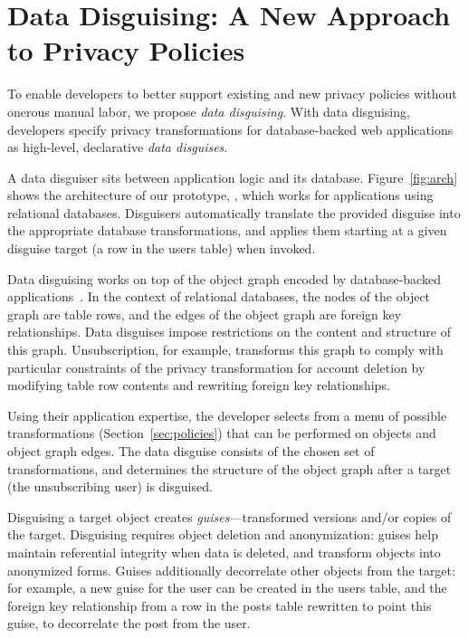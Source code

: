 \section{Data Disguising: A New Approach to Privacy Policies}
%

To enable developers to better support existing and new privacy policies without onerous manual
labor, we propose \emph{data disguising}.
%
With data disguising, developers specify privacy transformations for database-backed web
applications as high-level, declarative \emph{data disguises}.

A data disguiser sits between application logic and its database. Figure~\ref{fig:arch} shows the
architecture of our prototype, \sys, which works for applications using relational databases.
Disguisers automatically translate the provided disguise into the appropriate database transformations, and
applies them starting at a given disguise target (\eg a row in the users table) when invoked.

Data disguising works on top of the object graph encoded by database-backed
applications~\cite{orm}. In the context of relational databases, the nodes of the object graph are
table rows, and the edges of the object graph are foreign key relationships. Data disguises impose
restrictions on the content and structure of this graph. Unsubscription, for example, transforms
this graph to comply with particular constraints of the privacy transformation for account deletion
by modifying table row contents and rewriting foreign key relationships.

Using their application expertise, the developer selects from a menu of possible transformations
(Section~\ref{sec:policies}) that can be performed on objects and object graph edges.
The data disguise consists of the chosen set of transformations, and determines the
structure of the object graph after a target (\eg the unsubscribing user) is disguised.

Disguising a target object creates \emph{guises}---transformed versions and/or copies of the target.
Disguising requires object deletion and anonymization: guises help maintain referential integrity
when data is deleted, and transform objects into anonymized forms.  Guises additionally decorrelate
other objects from the target: for example, a new guise for the user can be created in the users
table, and the foreign key relationship from a row in the posts table rewritten to point this guise,
to decorrelate the post from the user.

